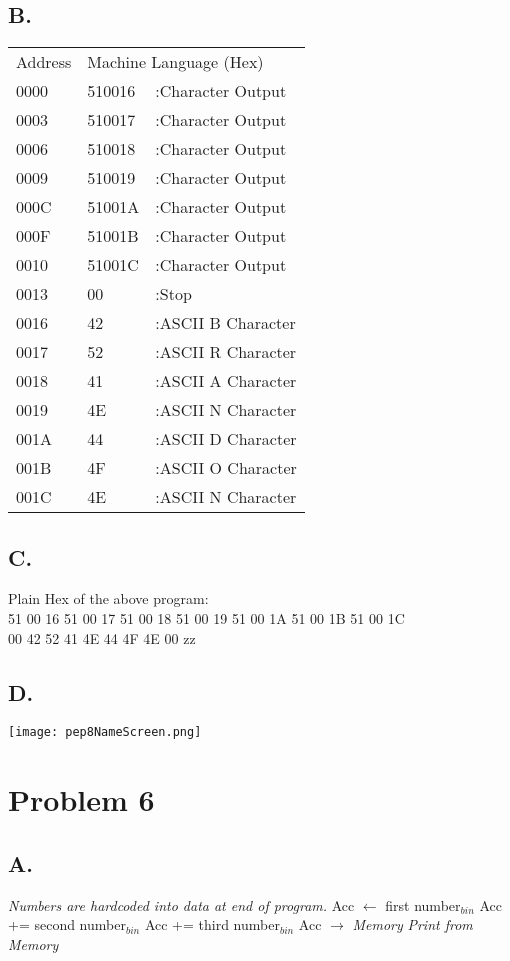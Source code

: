 \documentclass[a4paper,man,natbib]{apa6}
\begin{document}
\subsection{B.}
	\begin{tabular}{l l l}
		Address & \multicolumn{2}{l}{Machine Language (Hex)} \\ \cline{1-3}
		0000 & 510016 & :Character Output \\
		0003 & 510017 & :Character Output \\
		0006 & 510018 & :Character Output \\
		0009 & 510019 & :Character Output \\ 
		000C & 51001A & :Character Output \\
		000F & 51001B & :Character Output \\
		0010 & 51001C & :Character Output \\
		0013 & 00 & :Stop \\
		0016 & 42 & :ASCII B Character \\
		0017 & 52 & :ASCII R Character \\
		0018 & 41 & :ASCII A Character \\
		0019 & 4E & :ASCII N Character \\
		001A & 44 & :ASCII D Character \\
		001B & 4F & :ASCII O Character \\
		001C & 4E & :ASCII N Character \\
	\end{tabular}
\subsection{C.}
Plain Hex of the above program: \\
51 00 16 51 00 17 51 00 18 51 00 19 51 00 1A 51 00 1B 51 00 1C \\
00 42 52 41 4E 44 4F 4E 00 zz
\subsection{D.}
\begin{minipage}{\linewidth}
	\texttt{[image: pep8NameScreen.png]}
\end{minipage}

\section{Problem 6}
\subsection{A.}
\begin{algorithm}
	\begin{algorithmic}
		\State\emph{Numbers are hardcoded into data at end of program.}
		\State Acc $\gets$ first number$_{bin}$
		\State Acc += second number$_{bin}$ 
		\State Acc += third number$_{bin}$
		\State Acc $\rightarrow$ \emph{Memory}
		\State\emph{Print from Memory}
	\end{algorithmic}
\end{algorithm}
\end{document}
